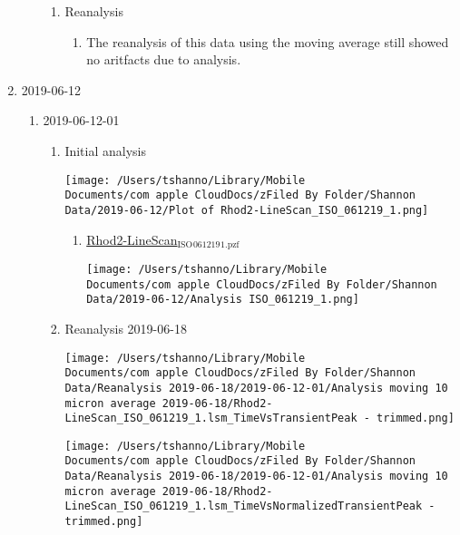 \documentclass[11pt]{article}
\begin{document}
\begin{enumerate}
\begin{enumerate}
\begin{enumerate}
\item Reanalysis
\label{sec:org392afe9}
\begin{enumerate}
\item The reanalysis of this data using the moving average still showed no aritfacts due to analysis.
\label{sec:org0ce1e97}
\end{enumerate}
\end{enumerate}
\end{enumerate}
\item 2019-06-12
\label{sec:orga6a4833}
\begin{enumerate}
\item 2019-06-12-01
\label{sec:org623fa4d}
\begin{enumerate}
\item Initial analysis
\label{sec:org565827b}
\begin{center}
\texttt{[image: /Users/tshanno/Library/Mobile Documents/com~apple~CloudDocs/zFiled By Folder/Shannon Data/2019-06-12/Plot of Rhod2-LineScan\_ISO\_061219\_1.png]}
\end{center}
\begin{enumerate}
\item \href{file:///Users/tshanno/Library/Mobile Documents/com\~apple\~CloudDocs/zFiled By Folder/Shannon Data/2019-06-12/Rhod2-LineScan\_ISO\_061219\_1.pzf}{Rhod2-LineScan\(_{\text{ISO}}\)\(_{\text{061219}}\)\(_{\text{1.pzf}}\)}
\label{sec:org3518fc1}
\begin{center}
\texttt{[image: /Users/tshanno/Library/Mobile Documents/com~apple~CloudDocs/zFiled By Folder/Shannon Data/2019-06-12/Analysis ISO\_061219\_1.png]}
\end{center}
\end{enumerate}
\item Reanalysis 2019-06-18
\label{sec:org742a957}
\begin{center}
\texttt{[image: /Users/tshanno/Library/Mobile Documents/com~apple~CloudDocs/zFiled By Folder/Shannon Data/Reanalysis 2019-06-18/2019-06-12-01/Analysis moving 10 micron average 2019-06-18/Rhod2-LineScan\_ISO\_061219\_1.lsm\_TimeVsTransientPeak - trimmed.png]}
\end{center}
\begin{center}
\texttt{[image: /Users/tshanno/Library/Mobile Documents/com~apple~CloudDocs/zFiled By Folder/Shannon Data/Reanalysis 2019-06-18/2019-06-12-01/Analysis moving 10 micron average 2019-06-18/Rhod2-LineScan\_ISO\_061219\_1.lsm\_TimeVsNormalizedTransientPeak - trimmed.png]}

\end{center}
\end{enumerate}
\end{enumerate}
\end{enumerate}
\end{document}
